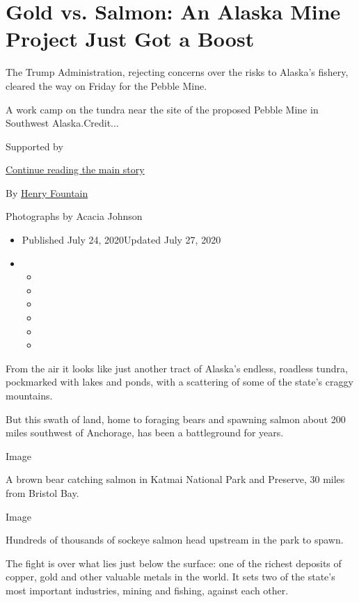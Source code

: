 \hypertarget{gold-vs-salmon-an-alaska-mine-project-just-got-a-boost}{%
\section{Gold vs. Salmon: An Alaska Mine Project Just Got a
Boost}\label{gold-vs-salmon-an-alaska-mine-project-just-got-a-boost}}

The Trump Administration, rejecting concerns over the risks to Alaska's
fishery, cleared the way on Friday for the Pebble Mine.

A work camp on the tundra near the site of the proposed Pebble Mine in
Southwest Alaska.Credit...

Supported by

\protect\hyperlink{after-sponsor}{Continue reading the main story}

By \href{https://www.nytimes3xbfgragh.onion/by/henry-fountain}{Henry
Fountain}

Photographs by Acacia Johnson

\begin{itemize}
\item
  Published July 24, 2020Updated July 27, 2020
\item
  \begin{itemize}
  \item
  \item
  \item
  \item
  \item
  \item
  \end{itemize}
\end{itemize}

From the air it looks like just another tract of Alaska's endless,
roadless tundra, pockmarked with lakes and ponds, with a scattering of
some of the state's craggy mountains.

But this swath of land, home to foraging bears and spawning salmon about
200 miles southwest of Anchorage, has been a battleground for years.

Image

A brown bear catching salmon in Katmai National Park and Preserve, 30
miles from Bristol Bay.

Image

Hundreds of thousands of sockeye salmon head upstream in the park to
spawn.

The fight is over what lies just below the surface: one of the richest
deposits of copper, gold and other valuable metals in the world. It sets
two of the state's most important industries, mining and fishing,
against each other.

